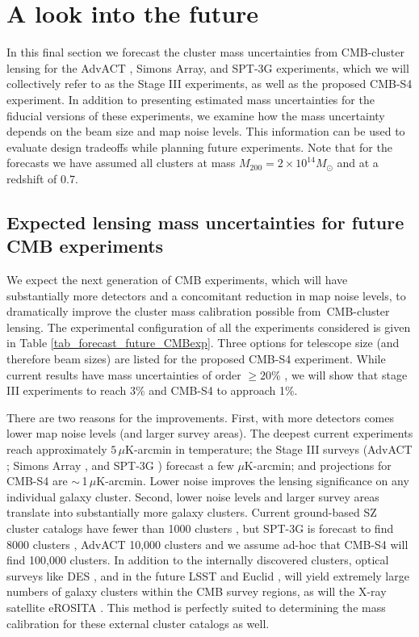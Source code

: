 \section{A look into the future}
\label{sec_forecast}
In this final section we forecast the cluster mass uncertainties from CMB-cluster lensing for the AdvACT , Simons Array, and SPT-3G experiments, which we will collectively refer to as the Stage III experiments, as well as the proposed CMB-S4 experiment.
In addition to presenting estimated mass uncertainties for the fiducial versions of these experiments, we examine how the mass uncertainty depends on  the beam size and map noise levels.
This information can be used to evaluate design tradeoffs while planning future experiments.
 Note that for the forecasts we have assumed all clusters at  mass $M_{200} = 2 \times 10^{14} M_{\odot}$  and at a redshift of 0.7.
\subsection{Expected lensing mass uncertainties for future CMB experiments}
\label{sec_cmbs4}

We expect the next generation of CMB experiments, which will have substantially more detectors and a concomitant reduction in map noise levels, to dramatically improve the cluster mass calibration possible from\
 CMB-cluster lensing.
The experimental configuration of all the experiments considered is given in Table \ref{tab_forecast_future_CMBexp}.
Three options for telescope size (and therefore beam sizes) are listed for the proposed CMB-S4 experiment.
While current results have mass uncertainties of order $\ge 20$\% \citep{baxter15,madhavacheril15,placksz15}, we will show that stage III experiments to reach 3\% and CMB-S4 to approach 1\%.

There are two reasons for the improvements.
First, with more detectors comes lower map noise levels (and larger survey areas).
The deepest current experiments reach approximately $5\,\mu$K-arcmin in temperature; the Stage III surveys  (AdvACT \citep{henderson16};  Simons Array \citep{suzuki15}, and SPT-3G \citep{benson14}) forecast a few $\mu$K-arcmin; and projections for CMB-S4 are $\sim$\,1\,$\mu$K-arcmin.
Lower noise improves the lensing significance on any individual galaxy cluster.
Second, lower noise levels and larger survey areas translate into substantially more galaxy clusters.
Current ground-based SZ cluster catalogs have fewer than 1000 clusters \citep{hasselfield13, bleem15}, but SPT-3G is forecast to find 8000 clusters \citep{benson14}, AdvACT 10,000 clusters \citep{henderson16} and we assume ad-hoc that CMB-S4 will find 100,000 clusters.
In addition to the internally discovered clusters, optical surveys like DES \citep{rykoff16}, and in the future LSST \citep{lsst09} and Euclid \citep{euclid10}, will yield extremely large numbers of galaxy clusters within the CMB survey regions, as will the X-ray satellite eROSITA \citep{erosita12}.
This method is perfectly suited to determining the mass calibration for these external cluster catalogs as well.

